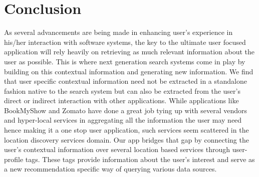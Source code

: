 \documentclass[12pt,letterpaper]{article}
\begin{document}
\section{Conclusion}
As several advancements are being made in enhancing user’s experience in his/her interaction with software systems, the key to the ultimate user focused application will rely heavily on retrieving as much relevant information about the user as possible. This is where next generation search systems come in play by building on this contextual information and generating new information. We find that user specific contextual information need not be extracted in a standalone fashion native to the search system but can also be extracted from the user’s direct or indirect interaction with other applications. While applications like BookMyShow\cite{bookmyshow} and Zomato\cite{zomato} have done a great job tying up with several vendors and hyper-local services in aggregating all the information the user may need hence making it a one stop user application, such services seem scattered in the location discovery services domain. Our app bridges that gap by connecting the user’s contextual information over several location based services through user-profile tags. These tags provide information about the user’s interest and serve as a new recommendation specific way of querying various data sources.
\end{document}
